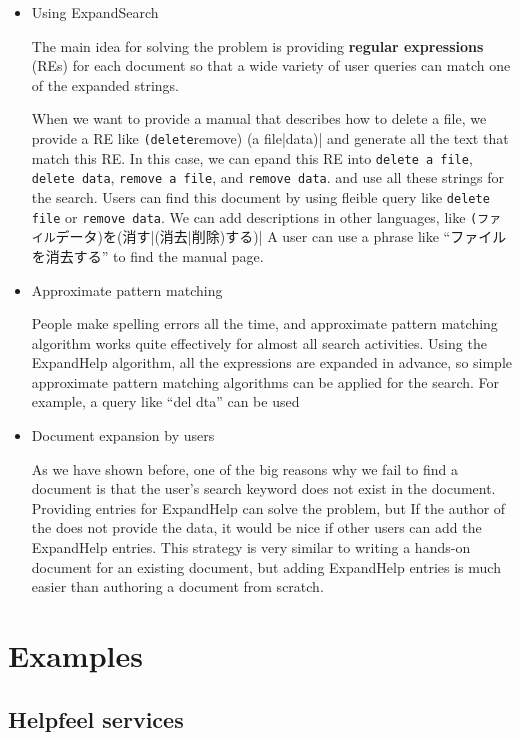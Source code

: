 \documentclass[manuscript,screen,review]{acmart}
\begin{document}
\begin{itemize}

\item Using ExpandSearch

The main idea for solving the problem is 
providing \textbf{regular expressions} (REs)
for  each document so that a wide variety of user queries can match one of the expanded strings.

When we want to provide a manual that describes how to delete a file, 
we provide a RE like \verb|(delete|remove) (a file|data)|
and generate all the text that match this RE.
In this case, we can epand this RE into
\verb|delete a file|,
\verb|delete data|,
\verb|remove a file|, and
\verb|remove data|.
and use all these strings for the search.
Users can find this document by using fleible query like
\verb|delete file| or
\verb|remove data|.
We can add descriptions in other languages, like \verb|(ファイル|データ)を(消す|(消去|削除)する)|
A user can use a phrase like ``ファイルを消去する'' to find the manual page.

\item Approximate pattern matching

People make spelling errors all the time, and approximate pattern matching algorithm works quite effectively for almost all search activities.
Using the ExpandHelp algorithm, all the expressions are expanded in advance,
so simple approximate pattern matching algorithms can be applied for the search.
For example, a query like ``del dta'' can be used

\item Document expansion by users

As we have shown before, one of the big reasons why we fail to find a document is that
the user's search keyword does not exist in the document.
 Providing entries for ExpandHelp can solve the problem, but
If the author of the does not provide the data, it would be nice if other users can add
the ExpandHelp entries.
This strategy is very similar to writing a hands-on document for an existing document,
but adding ExpandHelp entries is much easier than authoring  a document from scratch.

\end{itemize}

\section{Examples}

\subsection{Helpfeel services}
\end{document}
